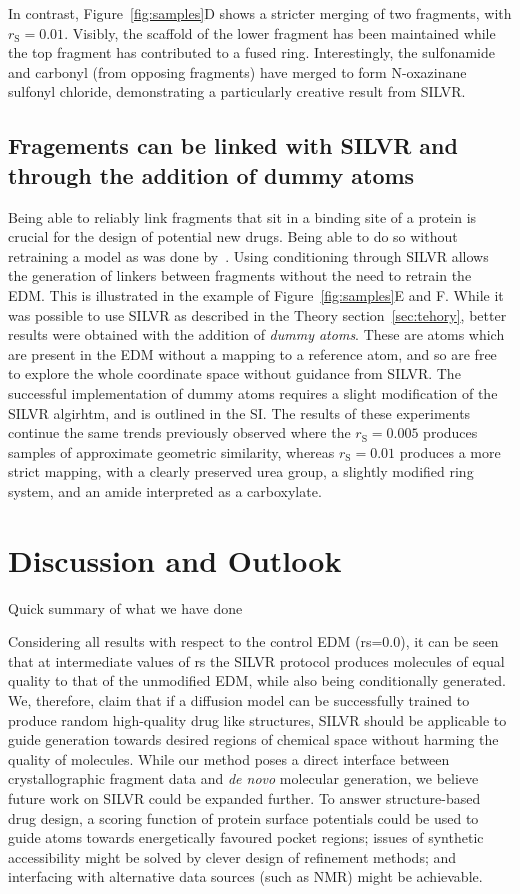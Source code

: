 \documentclass[journal=jacsat,manuscript=article]{achemso}
\begin{document}
In contrast, Figure~\ref{fig:samples}D shows a stricter merging of two fragments, with $r_{\mathrm{S}}=0.01$. Visibly, the scaffold of the lower fragment has been maintained while the top fragment has contributed to a fused ring. Interestingly, the sulfonamide and carbonyl (from opposing fragments) have merged to form N-oxazinane sulfonyl chloride, demonstrating a particularly creative result from SILVR. 

\subsection{Fragements can be linked with SILVR and through the addition of dummy atoms}
\label{sec:linker}
Being able to reliably link fragments that sit in a binding site of a protein is crucial for the design of potential new drugs. Being able to do so without retraining a model as was done by~\cite{huang20223dlinker}. Using conditioning through SILVR allows the generation of linkers between fragments without the need to retrain the EDM. This is illustrated in the example of Figure~\ref{fig:samples}E and F. While it was possible to use SILVR as described in the Theory section~\ref{sec:tehory}, better results were obtained with the addition of \textit{dummy atoms}. These are atoms which are present in the EDM without a mapping to a reference atom, and so are free to explore the whole coordinate space without guidance from SILVR. The successful implementation of dummy atoms requires a slight modification of the SILVR algirhtm, and is outlined in the SI. The results of these experiments continue the same trends previously observed where the $r_{\mathrm{S}}=0.005$ produces samples of approximate geometric similarity, whereas $r_{\mathrm{S}}=0.01$ produces a more strict mapping, with a clearly preserved urea group, a slightly modified ring system, and an amide interpreted as a carboxylate.

\section{Discussion and Outlook}
\label{sec:discussion}
Quick summary of what we have done

Considering all results with respect to the control EDM (rs=0.0), it can be seen that at intermediate values of rs the SILVR protocol produces molecules of equal quality to that of the unmodified EDM, while also being conditionally generated. We, therefore, claim that if a diffusion model can be successfully trained to produce random high-quality drug like structures, SILVR should be applicable to guide generation towards desired regions of chemical space without harming the quality of molecules. While our method poses a direct interface between crystallographic fragment data and \textit{de novo} molecular generation, we believe future work on SILVR could be expanded further. To answer structure-based drug design, a scoring function of protein surface potentials could be used to guide atoms towards energetically favoured pocket regions; issues of synthetic accessibility might be solved by clever design of refinement methods; and interfacing with alternative data sources (such as NMR) might be achievable. 
\end{document}
